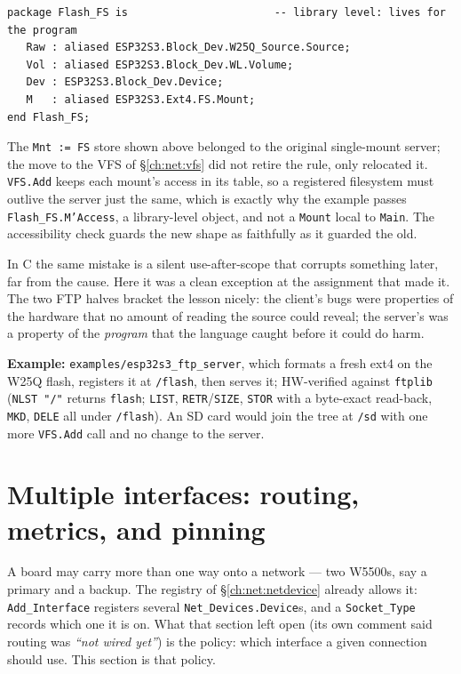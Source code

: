 \begin{lstlisting}
package Flash_FS is                       -- library level: lives for the program
   Raw : aliased ESP32S3.Block_Dev.W25Q_Source.Source;
   Vol : aliased ESP32S3.Block_Dev.WL.Volume;
   Dev : ESP32S3.Block_Dev.Device;
   M   : aliased ESP32S3.Ext4.FS.Mount;
end Flash_FS;
\end{lstlisting}

The \texttt{Mnt := FS} store shown above belonged to the original single-mount
server; the move to the VFS of \S\ref{ch:net:vfs} did not retire the rule, only
relocated it. \texttt{VFS.Add} keeps each mount's access in its table, so a
registered filesystem must outlive the server just the same, which is exactly
why the example passes \texttt{Flash\_FS.M'Access}, a library-level object, and not
a \texttt{Mount} local to \texttt{Main}. The accessibility check guards the new
shape as faithfully as it guarded the old.

In C the same mistake is a silent use-after-scope that corrupts something later, far
from the cause. Here it was a clean exception at the assignment that made it. The
two FTP halves bracket the lesson nicely: the client's bugs were properties of the
hardware that no amount of reading the source could reveal; the server's was a
property of the \emph{program} that the language caught before it could do harm.

\noindent\textbf{Example:} \texttt{examples/esp32s3\_ftp\_server}, which formats a
fresh ext4 on the W25Q flash, registers it at \texttt{/flash}, then serves it;
HW-verified against \texttt{ftplib} (\texttt{NLST "/"} returns \texttt{flash};
\texttt{LIST}, \texttt{RETR}/\texttt{SIZE}, \texttt{STOR} with a byte-exact
read-back, \texttt{MKD}, \texttt{DELE} all under \texttt{/flash}). An SD card would
join the tree at \texttt{/sd} with one more \texttt{VFS.Add} call and no change to
the server.

\section{Multiple interfaces: routing, metrics, and pinning}
\label{ch:net:multinic}

A board may carry more than one way onto a network --- two W5500s, say a primary and
a backup. The registry of \S\ref{ch:net:netdevice} already allows it:
\texttt{Add\_Interface} registers several \texttt{Net\_Devices.Device}s, and a
\texttt{Socket\_Type} records which one it is on. What that section left open
(its own comment said routing was \emph{``not wired yet''}) is the policy: which
interface a given connection should use. This section is that policy.

